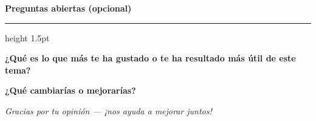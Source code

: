 \documentclass[a4paper,11pt]{article}
\newcommand{\bloqueheader}[2]{%
  \vspace{8pt}
  {\large\bfseries\color{#1} #2}
  \vspace{4pt}
  \hrule height 1.5pt \relax
  \vspace{6pt}
}
\begin{document}
\vspace{14pt}

\bloqueheader{headerblue}{Preguntas abiertas \normalfont\small(opcional)}

\noindent\textbf{¿Qué es lo que más te ha gustado o te ha resultado más útil de este tema?}

\vspace{6pt}
\noindent\underline{\hspace{\linewidth}}

\vspace{8pt}
\noindent\underline{\hspace{\linewidth}}

\vspace{12pt}
\noindent\textbf{¿Qué cambiarías o mejorarías?}

\vspace{6pt}
\noindent\underline{\hspace{\linewidth}}

\vspace{8pt}
\noindent\underline{\hspace{\linewidth}}

\vspace{16pt}

\begin{center}
  \small\color{gray}\itshape
  Gracias por tu opinión — ¡nos ayuda a mejorar juntos!
\end{center}
\end{document}
